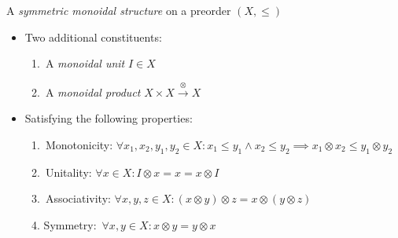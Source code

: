 
A \emph{symmetric monoidal structure} on a preorder $(X, \leq)$

\begin{itemize}
    \item Two additional constituents:
          \begin{enumerate}
            \item \,A \emph{monoidal unit} $I \in X$\,
            \item \,A \emph{monoidal product} $X \times X \xrightarrow{\otimes} X$\,
          \end{enumerate}
    \item Satisfying the following properties:
          \begin{enumerate}
            \item  \,Monotonicity: $\forall x_1,x_2,y_1,y_2 \in X: x_1 \leq y_1 \land x_2 \leq y_2 \implies x_1 \otimes x_2 \leq y_1 \otimes y_2$\,
            \item \,Unitality: $\forall x \in X: I \otimes x = x = x \otimes I$\,
            \item \,Associativity: $\forall x,y,z \in X: (x \otimes y) \otimes z = x \otimes (y\otimes z)$\,
            \item Symmetry: \,$\forall x,y \in X: x \otimes y = y \otimes x$\,
          \end{enumerate}
  \end{itemize}
